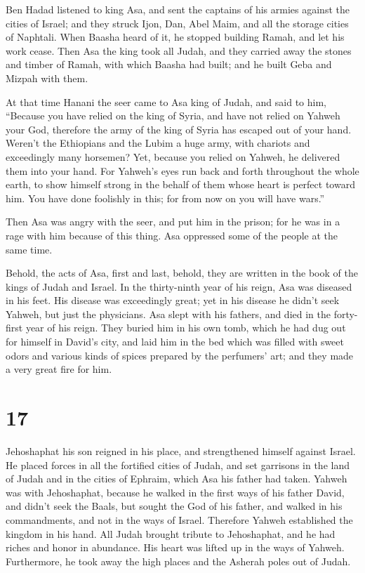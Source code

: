  Ben Hadad listened to king Asa, and sent the captains of
his armies against the cities of Israel; and they struck Ijon, Dan, Abel
Maim, and all the storage cities of Naphtali.  When Baasha
heard of it, he stopped building Ramah, and let his work cease.
 Then Asa the king took all Judah, and they carried away the
stones and timber of Ramah, with which Baasha had built; and he built
Geba and Mizpah with them.

 At that time Hanani the seer came to Asa king of Judah, and
said to him, ``Because you have relied on the king of Syria, and have
not relied on Yahweh your God, therefore the army of the king of Syria
has escaped out of your hand.  Weren't the Ethiopians and
the Lubim a huge army, with chariots and exceedingly many horsemen? Yet,
because you relied on Yahweh, he delivered them into your hand.
 For Yahweh's eyes run back and forth throughout the whole
earth, to show himself strong in the behalf of them whose heart is
perfect toward him. You have done foolishly in this; for from now on you
will have wars.''

 Then Asa was angry with the seer, and put him in the
prison; for he was in a rage with him because of this thing. Asa
oppressed some of the people at the same time.

 Behold, the acts of Asa, first and last, behold, they are
written in the book of the kings of Judah and Israel.  In
the thirty-ninth year of his reign, Asa was diseased in his feet. His
disease was exceedingly great; yet in his disease he didn't seek Yahweh,
but just the physicians.  Asa slept with his fathers, and
died in the forty-first year of his reign.  They buried him
in his own tomb, which he had dug out for himself in David's city, and
laid him in the bed which was filled with sweet odors and various kinds
of spices prepared by the perfumers' art; and they made a very great
fire for him.

\hypertarget{section-16}{%
\section{17}\label{section-16}}

 Jehoshaphat his son reigned in his place, and strengthened
himself against Israel.  He placed forces in all the
fortified cities of Judah, and set garrisons in the land of Judah and in
the cities of Ephraim, which Asa his father had taken. 
Yahweh was with Jehoshaphat, because he walked in the first ways of his
father David, and didn't seek the Baals,  but sought the God
of his father, and walked in his commandments, and not in the ways of
Israel.  Therefore Yahweh established the kingdom in his
hand. All Judah brought tribute to Jehoshaphat, and he had riches and
honor in abundance.  His heart was lifted up in the ways of
Yahweh. Furthermore, he took away the high places and the Asherah poles
out of Judah.

